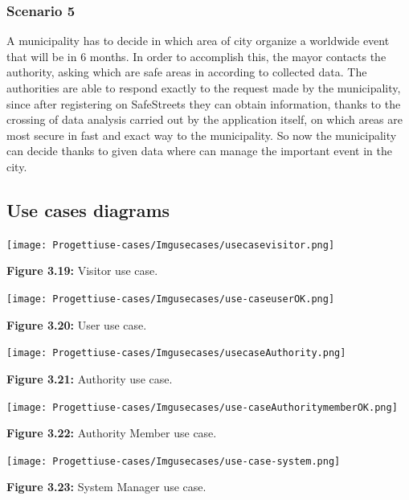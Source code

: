 \documentclass[12pt]{article}
\begin{document}
\subsubsection{Scenario 5}
\vspace{2mm}
A municipality has to decide in which area of city organize a worldwide event that will be in 6 months. In order to accomplish this, the mayor contacts the authority, asking which are safe areas in according to collected data. The authorities are able to respond exactly to the request made by the municipality, since after registering on SafeStreets they can obtain information, thanks to the crossing of data analysis carried out by the application itself, on which areas are most secure in fast and exact way to the municipality. So now the municipality can decide thanks to given data where can manage the important event in the city.

\newpage

\subsection{Use cases diagrams}

\vspace{5mm}
\begin{center}
\texttt{[image: Progettiuse-cases/Imgusecases/usecasevisitor.png]}                 

\textbf{Figure 3.19:} Visitor use case. 
\end{center}

\begin{center}
\texttt{[image: Progettiuse-cases/Imgusecases/use-caseuserOK.png]}                 

\textbf{Figure 3.20:} User use case. 
\end{center}

\newpage
\vspace{5mm}
\begin{center}
\texttt{[image: Progettiuse-cases/Imgusecases/usecaseAuthority.png]}                 

\textbf{Figure 3.21:} Authority use case. 
\end{center}

\begin{center}
\texttt{[image: Progettiuse-cases/Imgusecases/use-caseAuthoritymemberOK.png]}                 

\textbf{Figure 3.22:} Authority Member use case. 
\end{center}

\begin{center}
\texttt{[image: Progettiuse-cases/Imgusecases/use-case-system.png]}                  

\textbf{Figure 3.23:} System Manager use case. 
\end{center}
\end{document}
